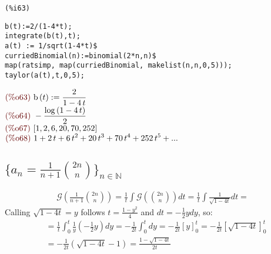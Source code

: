 \noindent
\begin{minipage}[t]{8ex}{\color{red}\bf
\begin{verbatim}
(%i63) 
\end{verbatim}}
\end{minipage}
\begin{minipage}[t]{\textwidth}{\color{blue}
\begin{verbatim}
b(t):=2/(1-4*t);
integrate(b(t),t);
a(t) := 1/sqrt(1-4*t)$
curriedBinomial(n):=binomial(2*n,n)$
map(ratsimp, map(curriedBinomial, makelist(n,n,0,5)));
taylor(a(t),t,0,5);
\end{verbatim}}
\end{minipage}
\begin{math}\displaystyle
\parbox{8ex}{\color{labelcolor}(\%o63) }
\mathrm{b}\left( t\right) :=\frac{2}{1-4\,t}
\end{math}\\
\begin{math}\displaystyle
\parbox{8ex}{\color{labelcolor}(\%o64) }
-\frac{\mathrm{log}\left( 1-4\,t\right) }{2}
\end{math}\\
\begin{math}\displaystyle
\parbox{8ex}{\color{labelcolor}(\%o67) }
[1,2,6,20,70,252]
\end{math}\\
\begin{math}\displaystyle
\parbox{8ex}{\color{labelcolor}(\%o68) }
1+2\,t+6\,{t}^{2}+20\,{t}^{3}+70\,{t}^{4}+252\,{t}^{5}+...
\end{math}

\subsection{$\{a_n = \frac{1}{n+1} {{2n}\choose{n}} \}_{n \in
    \mathbb{N} }$}

\begin{displaymath}
  \begin{split}
    \mathcal{G} ( \frac{1}{n+1} {{2n}\choose{n}}) = \frac{1}{t}
    \int{\mathcal{G} ({{2n}\choose{n}} )dt} = \frac{1}{t} \int{
      \frac{1}{\sqrt{1-4t}} dt} =
  \end{split}
\end{displaymath}
Calling $\sqrt{1-4t} = y$ follows $t = \frac{1-y^2}{4} $ and $dt = -
\frac{1}{2}y dy $, so:
\begin{displaymath}
  \begin{split}
    &= \frac{1}{t} \int_0^t{ \frac{1}{y}\left( - \frac{1}{2}y\right)
      dy} = -\frac{1}{2t} \int_0^t{ dy} = -\frac{1}{2t}
    \left[y\right]_0^t = -\frac{1}{2t} \left[\sqrt{1-4t}\right]_0^t\\
    &= -\frac{1}{2t}(\sqrt{1-4t} - 1) = \frac{1- \sqrt{1-4t}}{2t}
  \end{split}
\end{displaymath}

